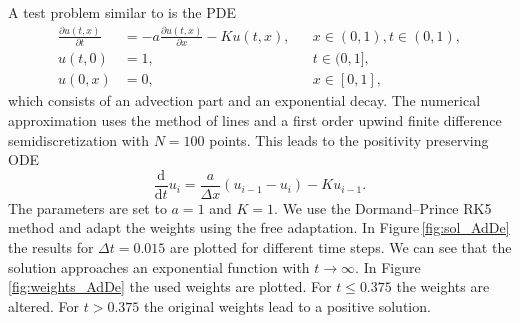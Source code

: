 \documentclass[a4paper]{article}
\numberwithin{equation}{section}
\theoremstyle{plain}
\theoremstyle{definition}
\numberwithin{theorem}{section}
\newcommand{\1}{\mathbbm{1}}
\begin{document}
A test problem similar to \cite{shampine_non-negative_2005} is the PDE
\begin{equation}
\label{eq:advection-decay}
\begin{aligned}
  \frac{\partial u(t,x)}{\partial t}
  &=
  -a \frac{\partial u(t,x)}{\partial x} - K u(t,x),
  && x \in (0, 1), t \in (0,1),
  \\
  u(t,0) &= 1,
  && t \in (0,1],
  \\
  u(0,x) &= 0,
  && x \in [0,1],
\end{aligned}
\end{equation}
which consists of an advection part and an exponential decay.
The numerical approximation uses the method of lines and a first order
upwind finite difference semidiscretization with $N = 100$ points.
This leads to the positivity preserving ODE
\begin{equation}
\frac{\mathrm d}{\mathrm d t} u_i = \frac{a}{\Delta x} \left( u_{i-1} - u_i \right) - K u_{i-1}.
\end{equation}
The parameters are set to $a=1$ and $K=1$.
We use the Dormand--Prince RK5 method and adapt the weights using the free adaptation.
In Figure\,\ref{fig:sol_AdDe} the results for $\Delta t = 0.015$ are plotted for different time steps. We can see that the solution approaches an exponential function with $t \rightarrow \infty$.
In Figure\,\ref{fig:weights_AdDe} the used weights are plotted. For $t\leq 0.375$ the weights are altered. For $t > 0.375$ the original weights lead to a positive solution.
\end{document}
